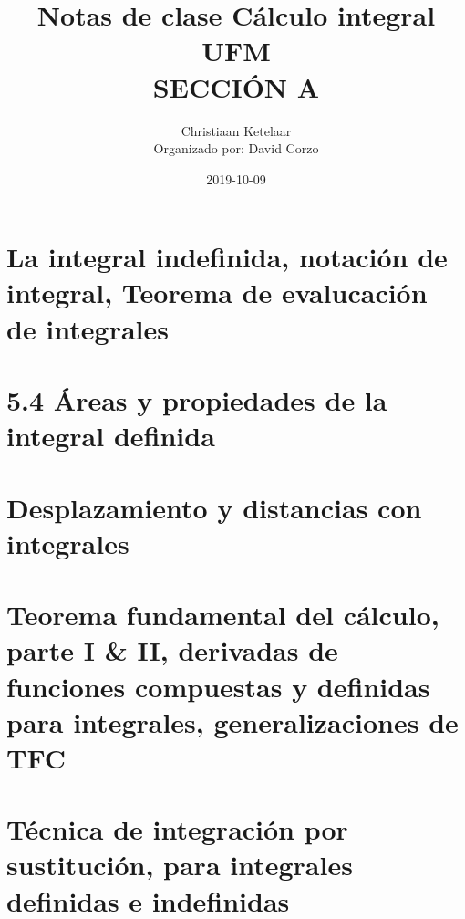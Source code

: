 \documentclass{book}
\title{Notas de clase Cálculo integral \\ UFM \\ SECCIÓN A}
\author{Christiaan Ketelaar \\ Organizado por: David Corzo}
\date{2019-10-09}
\begin{document}
\maketitle
\tableofcontents

\chapter{La integral indefinida, notación de integral, Teorema de evalucación de integrales} 


\chapter{5.4 Áreas y propiedades de la integral definida} 


\chapter{Desplazamiento y distancias con integrales} 


\chapter{Teorema fundamental del cálculo, parte I \& II, derivadas de funciones compuestas y definidas para integrales, generalizaciones de TFC} 


\chapter{Técnica de integración por sustitución, para integrales definidas e indefinidas} 

\end{document}
